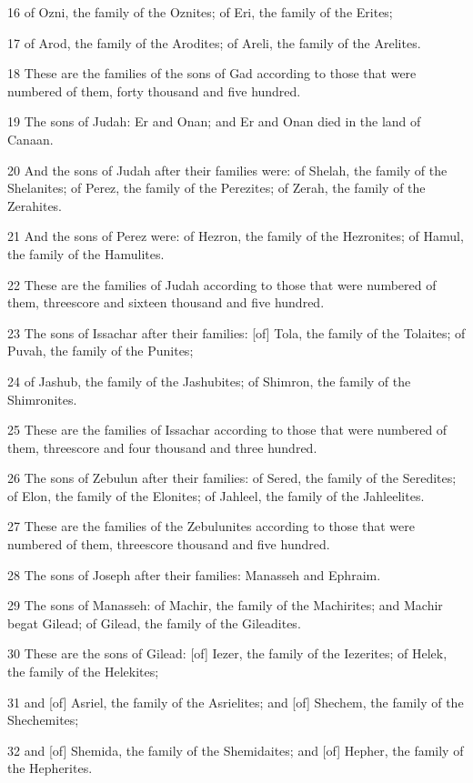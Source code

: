 \par 16 of Ozni, the family of the Oznites; of Eri, the family of the Erites;
\par 17 of Arod, the family of the Arodites; of Areli, the family of the Arelites.
\par 18 These are the families of the sons of Gad according to those that were numbered of them, forty thousand and five hundred.
\par 19 The sons of Judah: Er and Onan; and Er and Onan died in the land of Canaan.
\par 20 And the sons of Judah after their families were: of Shelah, the family of the Shelanites; of Perez, the family of the Perezites; of Zerah, the family of the Zerahites.
\par 21 And the sons of Perez were: of Hezron, the family of the Hezronites; of Hamul, the family of the Hamulites.
\par 22 These are the families of Judah according to those that were numbered of them, threescore and sixteen thousand and five hundred.
\par 23 The sons of Issachar after their families: [of] Tola, the family of the Tolaites; of Puvah, the family of the Punites;
\par 24 of Jashub, the family of the Jashubites; of Shimron, the family of the Shimronites.
\par 25 These are the families of Issachar according to those that were numbered of them, threescore and four thousand and three hundred.
\par 26 The sons of Zebulun after their families: of Sered, the family of the Seredites; of Elon, the family of the Elonites; of Jahleel, the family of the Jahleelites.
\par 27 These are the families of the Zebulunites according to those that were numbered of them, threescore thousand and five hundred.
\par 28 The sons of Joseph after their families: Manasseh and Ephraim.
\par 29 The sons of Manasseh: of Machir, the family of the Machirites; and Machir begat Gilead; of Gilead, the family of the Gileadites.
\par 30 These are the sons of Gilead: [of] Iezer, the family of the Iezerites; of Helek, the family of the Helekites;
\par 31 and [of] Asriel, the family of the Asrielites; and [of] Shechem, the family of the Shechemites;
\par 32 and [of] Shemida, the family of the Shemidaites; and [of] Hepher, the family of the Hepherites.

